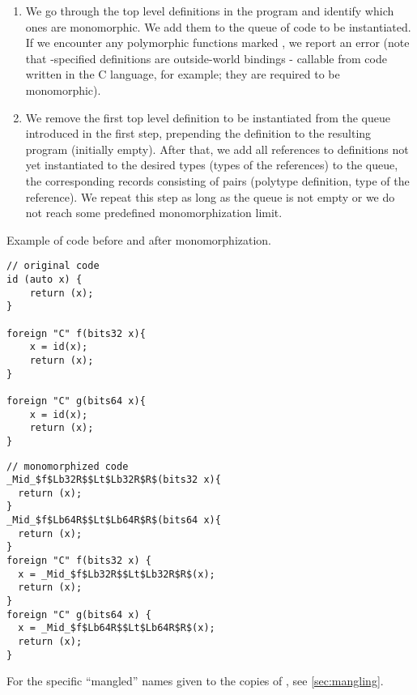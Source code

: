 \begin{enumerate}
    \item We go through the top level definitions in the program and identify which ones are monomorphic. We add them to the queue of code to be instantiated. If we encounter any polymorphic functions marked , we report an error (note that -specified definitions are outside-world bindings - callable from code written in the C language, for example; they are required to be monomorphic).

    \item We remove the first top level definition to be instantiated from the queue introduced in the first step, prepending the definition to the resulting program (initially empty). After that, we add all references to  definitions not yet instantiated to the desired types (types of the references) to the queue, the corresponding records consisting of pairs (polytype definition, type of the reference). We repeat this step as long as the queue is not empty or we do not reach some predefined monomorphization limit. \label{steptwo}
\end{enumerate}

\begin{listing}
    \caption{Example of code before and after monomorphization.}
    \label{lst:mono}
    \begin{center}
    \begin{minipage}{0.4\linewidth}
    \begin{lstlisting}
// original code
id (auto x) {
    return (x);
}

foreign "C" f(bits32 x){
    x = id(x);
    return (x);
}

foreign "C" g(bits64 x){
    x = id(x);
    return (x);
}
\end{lstlisting}
    \end{minipage}%
    \begin{minipage}{0.6\linewidth}
    \begin{lstlisting}
// monomorphized code
_Mid_$f$Lb32R$$Lt$Lb32R$R$(bits32 x){
  return (x);
}
_Mid_$f$Lb64R$$Lt$Lb64R$R$(bits64 x){
  return (x);
}
foreign "C" f(bits32 x) {
  x = _Mid_$f$Lb32R$$Lt$Lb32R$R$(x);
  return (x);
}
foreign "C" g(bits64 x) {
  x = _Mid_$f$Lb64R$$Lt$Lb64R$R$(x);
  return (x);
}
\end{lstlisting}
    \end{minipage}
    For the specific ``mangled'' names given to the copies of , see \cref{sec:mangling}.
    \end{center}
\end{listing}

